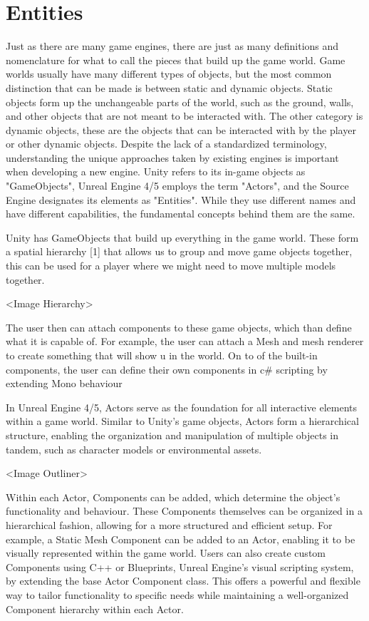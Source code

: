 \chapter{Entities}

Just as there are many game engines, there are just as many definitions and nomenclature
for what to call the pieces that build up the game world.
Game worlds usually have many different types of objects,
but the most common distinction that can be made is between static and dynamic objects.
Static objects form up the unchangeable parts of the world, such as the ground, walls, and other objects that are not meant to be interacted with.
The other category is dynamic objects, these are the objects that can be interacted with by the player or other dynamic objects.
Despite the lack of a standardized terminology,
understanding the unique approaches taken by existing engines is important when developing a new engine.
Unity refers to its in-game objects as "GameObjects",
Unreal Engine 4/5 employs the term "Actors",
and the Source Engine designates its elements as "Entities".
While they use different names and have different capabilities,
the fundamental concepts behind them are the same.

Unity has GameObjects that build up everything in the game world.
These form a spatial hierarchy [1] that allows us to group and move game objects together,
this can be used for a player where we might need to move multiple models together.

<Image Hierarchy>

The user then can attach components to these game objects, which than define what it is capable of.
For example, the user can attach a Mesh and mesh renderer to create something that will show u in the world.
On to of the built-in components, the user can define their own components in c\# scripting by extending Mono behaviour

In Unreal Engine 4/5, Actors serve as the foundation for all interactive elements within a game world.
Similar to Unity's game objects, Actors form a hierarchical structure,
enabling the organization and manipulation of multiple objects in tandem,
such as character models or environmental assets.

<Image Outliner>

Within each Actor, Components can be added, which determine the object's functionality and behaviour.
These Components themselves can be organized in a hierarchical fashion,
allowing for a more structured and efficient setup.
For example, a Static Mesh Component can be added to an Actor, enabling it to be visually represented within the game world.
Users can also create custom Components using C++ or Blueprints,
Unreal Engine's visual scripting system, by extending the base Actor Component class.
This offers a powerful and flexible way to tailor functionality to specific needs while maintaining a well-organized Component hierarchy within each Actor.

